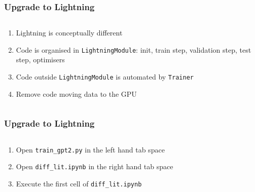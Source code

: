 \documentclass[
	notes=none,
	aspectratio=169
]{beamer}
\begin{document}

\begin{frame}
\frametitle{Upgrade to Lightning}

\begin{columns}[T]
\begin{column}[T]{1.0\textwidth}
\setlength{\parskip}{0.5em}

\vspace{0.0cm}
\begin{enumerate}
\setlength{\parskip}{0.5em}
\item Lightning is conceptually different
\item Code is organised in {\tt LightningModule}: init, train step, validation step, test step, optimisers
\item Code outside {\tt LightningModule} is automated by {\tt Trainer}
\item Remove code moving data to the GPU
\end{enumerate}

\end{column}
\end{columns}

\end{frame}
\note{
}

\begin{frame}
\frametitle{Upgrade to Lightning}

\begin{columns}[T]
\begin{column}[T]{1.0\textwidth}
\setlength{\parskip}{0.5em}

\vspace{0.0cm}
\begin{enumerate}
\setlength{\parskip}{0.5em}
\item Open {\tt train\_gpt2.py} in the left hand tab space
\item Open {\tt diff\_lit.ipynb} in the right hand tab space
\item Execute the first cell of {\tt diff\_lit.ipynb}
\end{enumerate}

\end{column}
\end{columns}

\end{frame}
\note{
}

\end{document}
